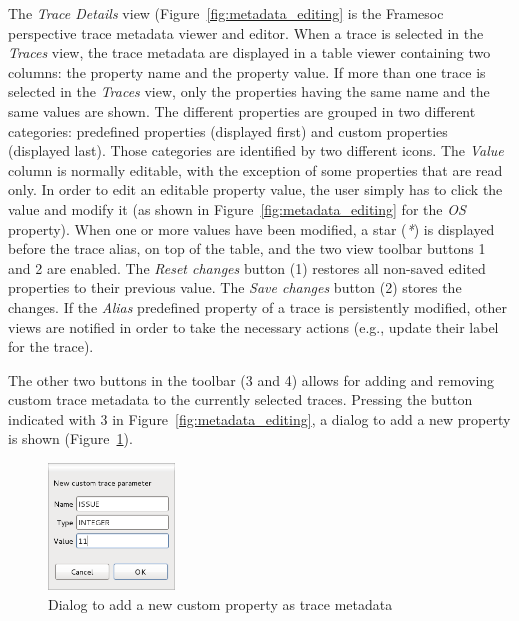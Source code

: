 \documentclass[twoside]{article}
\begin{document}
\begin{sloppypar}
The \emph{Trace Details} view (Figure~\ref{fig:metadata_editing} is the Framesoc perspective trace metadata viewer and editor.
When a trace is selected in the \emph{Traces} view, the trace metadata are displayed in a table viewer containing two columns: the property name and the property value.
If more than one trace is selected in the \emph{Traces} view, only the properties having the same name and the same values are shown.
The different properties are grouped in two different categories: predefined properties (displayed first) and custom properties (displayed last). 
Those categories are identified by two different icons.
The \emph{Value} column is normally editable, with the exception of some properties that are read only.
In order to edit an editable property value, the user simply has to click the value and modify it (as shown in Figure~\ref{fig:metadata_editing} for the \emph{OS} property).
When one or more values have been modified, a star (\emph{*}) is displayed before the trace alias, on top of the table, and the two view toolbar buttons \num{1} and \num{2} are enabled. 
The \emph{Reset changes} button (\num{1}) restores all non-saved edited properties to their previous value.
The \emph{Save changes} button (\num{2}) stores the changes.
If the \emph{Alias} predefined property of a trace is persistently modified, other views are notified in order to take the necessary actions (e.g., update their label for the trace).

The other two buttons in the toolbar (\num{3} and \num{4}) allows for adding and removing custom trace metadata to the currently selected traces. Pressing the button indicated with \num{3} in Figure~\ref{fig:metadata_editing}, a dialog to add a new property is shown (Figure~\ref{fig:new_metadata}).

\begin{figure}[h!]
  \centering
    \includegraphics[width=0.3\textwidth]{images/new_metadata.png}
  \caption{Dialog to add a new custom property as trace metadata}
  \label{fig:new_metadata}
\end{figure}


\end{sloppypar}
\end{document}

